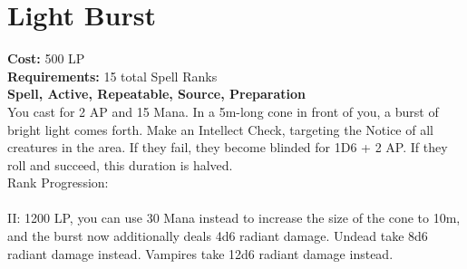 \section{Light Burst}\label{spell:lightBurst}
\textbf{Cost:} 500 LP\\
\textbf{Requirements:} 15 total Spell Ranks\\
\textbf{Spell, Active, Repeatable, Source, Preparation}\\
You cast for 2 AP and 15 Mana.
In a 5m-long cone in front of you, a burst of bright light comes forth.
Make an Intellect Check, targeting the Notice of all creatures in the area.
If they fail, they become blinded for 1D6 + 2 AP.
If they roll and succeed, this duration is halved.
\\
Rank Progression:\\
\\
II: 1200 LP, you can use 30 Mana instead to increase the size of the cone to 10m, and the burst now additionally deals 4d6 radiant damage.
Undead take 8d6 radiant damage instead.
Vampires take 12d6 radiant damage instead.